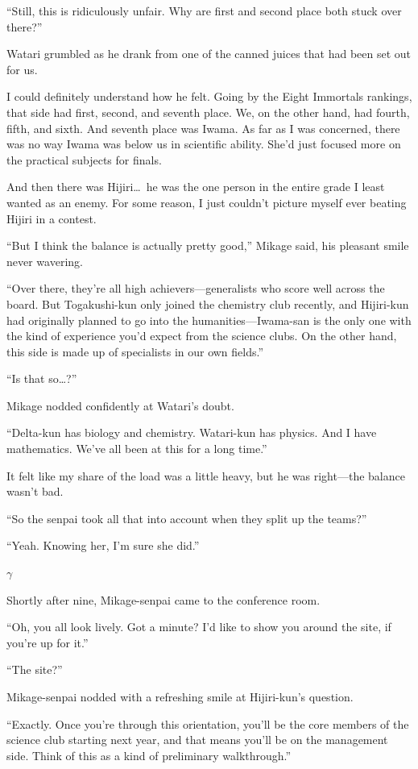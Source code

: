 \documentclass[
    a4paper,
    12pt,
    twoside,
    openany,
    UTF8,
    fontset=windows
]{ctexbook}
\begin{document}
``Still, this is ridiculously unfair. Why are first and second place both stuck over there?''

Watari grumbled as he drank from one of the canned juices that had been set out for us.

I could definitely understand how he felt. Going by the Eight Immortals rankings, that side had first, second, and seventh place. We, on the other hand, had fourth, fifth, and sixth. And seventh place was Iwama. As far as I was concerned, there was no way Iwama was below us in scientific ability. She'd just focused more on the practical subjects for finals.

And then there was Hijiri\dots\ he was the one person in the entire grade I least wanted as an enemy. For some reason, I just couldn't picture myself ever beating Hijiri in a contest.

``But I think the balance is actually pretty good,'' Mikage said, his pleasant smile never wavering.

``Over there, they're all high achievers---generalists who score well across the board. But Togakushi-kun only joined the chemistry club recently, and Hijiri-kun had originally planned to go into the humanities---Iwama-san is the only one with the kind of experience you'd expect from the science clubs. On the other hand, this side is made up of specialists in our own fields.''

``Is that so\dots?''

Mikage nodded confidently at Watari's doubt.

``Delta-kun has biology and chemistry. Watari-kun has physics. And I have mathematics. We've all been at this for a long time.''

It felt like my share of the load was a little heavy, but he was right---the balance wasn't bad.

``So the senpai took all that into account when they split up the teams?''

``Yeah. Knowing her, I'm sure she did.''

$\gamma$

Shortly after nine, Mikage-senpai came to the conference room.

``Oh, you all look lively. Got a minute? I'd like to show you around the site, if you're up for it.''

``The site?''

Mikage-senpai nodded with a refreshing smile at Hijiri-kun's question.

``Exactly. Once you're through this orientation, you'll be the core members of the science club starting next year, and that means you'll be on the management side. Think of this as a kind of preliminary walkthrough.''
\end{document}
